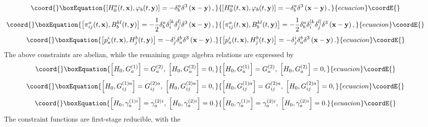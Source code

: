\documentclass[a4paper,12pt]{article}
\begin{document}
\begin{equation}\coord{}\boxEquation{
\left[ H_{0}^{a}(t,\mathbf{x}),\varphi _{b}(t,\mathbf{y})\right] =-\delta
_{b}^{a}\delta ^{3}\left( \mathbf{x}-\mathbf{y}\right) ,  \label{xx8}
}{
\left[ H_{0}^{a}(t,\mathbf{x}),\varphi _{b}(t,\mathbf{y})\right] =-\delta
_{b}^{a}\delta ^{3}\left( \mathbf{x}-\mathbf{y}\right) ,  }{ecuacion}\coordE{}\end{equation}
\begin{equation}\coord{}\boxEquation{
\left[ \pi _{ij}^{a}(t,\mathbf{x}),B_{b}^{kl}(t,\mathbf{y})\right] =-\frac{1
}{2}\delta _{b}^{a}\delta _{i}^{[k}\delta _{j}^{l]}\delta ^{3}\left( \mathbf{
x}-\mathbf{y}\right) ,  \label{xx9}
}{
\left[ \pi _{ij}^{a}(t,\mathbf{x}),B_{b}^{kl}(t,\mathbf{y})\right] =-\frac{1
}{2}\delta _{b}^{a}\delta _{i}^{[k}\delta _{j}^{l]}\delta ^{3}\left( \mathbf{
x}-\mathbf{y}\right) ,  }{ecuacion}\coordE{}\end{equation}
\begin{equation}\coord{}\boxEquation{
\left[ p_{a}^{i}(t,\mathbf{x}),H_{j}^{b}(t,\mathbf{y})\right] =-\delta
_{j}^{i}\delta _{a}^{b}\delta ^{3}\left( \mathbf{x}-\mathbf{y}\right) .
\label{xx10}
}{
\left[ p_{a}^{i}(t,\mathbf{x}),H_{j}^{b}(t,\mathbf{y})\right] =-\delta
_{j}^{i}\delta _{a}^{b}\delta ^{3}\left( \mathbf{x}-\mathbf{y}\right) .
}{ecuacion}\coordE{}\end{equation}
The above constraints are abelian, while the remaining gauge algebra
relations are expressed by 
\begin{equation}\coord{}\boxEquation{
\left[ H_{0},G_{a}^{(1)}\right] =G_{a}^{(2)},\;\left[
H_{0},G_{a}^{(2)}\right] =0,  \label{xx11}
}{
\left[ H_{0},G_{a}^{(1)}\right] =G_{a}^{(2)},\;\left[
H_{0},G_{a}^{(2)}\right] =0,  }{ecuacion}\coordE{}\end{equation}
\begin{equation}\coord{}\boxEquation{
\left[ H_{0},G_{ij}^{(1)a}\right] =G_{ij}^{(2)a},\;\left[
H_{0},G_{ij}^{(2)a}\right] =0,  \label{xx12}
}{
\left[ H_{0},G_{ij}^{(1)a}\right] =G_{ij}^{(2)a},\;\left[
H_{0},G_{ij}^{(2)a}\right] =0,  }{ecuacion}\coordE{}\end{equation}
\begin{equation}\coord{}\boxEquation{
\left[ H_{0},\gamma _{a}^{(1)i}\right] =\gamma _{a}^{(2)i},\;\left[
H_{0},\gamma _{a}^{(2)i}\right] =0.  \label{xx13}
}{
\left[ H_{0},\gamma _{a}^{(1)i}\right] =\gamma _{a}^{(2)i},\;\left[
H_{0},\gamma _{a}^{(2)i}\right] =0.  }{ecuacion}\coordE{}\end{equation}
The constraint functions \coordHE{} are first-stage reducible, with the
\end{document}
